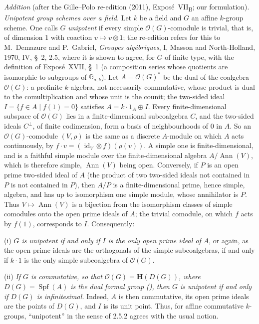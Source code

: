
\par\medskip\noindent
{}
\label{sga3:VIIB:add:unipotent}%
\emph{Addition} (after the Gille--Polo re-edition (2011),
Expos\'e~VII\textsubscript{B}; our formulation). \emph{Unipotent group
schemes over a field.} Let \(k\) be a field and \(G\) an affine \(k\)-group
scheme. One calls \(G\) \emph{unipotent} if every simple
\(\mathcal O(G)\)-comodule is trivial, that is, of dimension \(1\) with
coaction \(v\mapsto v\otimes1\); the re-edition refers for this to
M.~Demazure and P.~Gabriel, \emph{Groupes alg\'ebriques}, I, Masson and
North-Holland, 1970, IV, \S~2, 2.5, where it is shown to agree, for \(G\)
of finite type, with the definition of Expos\'e~XVII, \S~1 (a composition
series whose quotients are isomorphic to subgroups of \(\mathbb G_{a,k}\)).
Let \(A=\mathcal O(G)^*\) be the dual of the coalgebra \(\mathcal O(G)\): a
profinite \(k\)-algebra, not necessarily commutative, whose product is dual
to the comultiplication and whose unit is the counit; the two-sided ideal
\(I=\{f\in A\mid f(1)=0\}\) satisfies \(A=k\cdot1_A\oplus I\). Every
finite-dimensional subspace of \(\mathcal O(G)\) lies in a
finite-dimensional subcoalgebra \(C\), and the two-sided ideals
\(C^\perp\), of finite codimension, form a basis of neighbourhoods of \(0\)
in \(A\). So an \(\mathcal O(G)\)-comodule \((V,\rho)\) is the same as a
discrete \(A\)-module on which \(A\) acts continuously, by
\(f\cdot v=(\operatorname{id}_V\otimes f)(\rho(v))\). A simple one is
finite-dimensional, and is a faithful simple module over the
finite-dimensional algebra \(A/\operatorname{Ann}(V)\), which is therefore
simple, \(\operatorname{Ann}(V)\) being open. Conversely, if \(P\) is an
open prime two-sided ideal of \(A\) (the product of two two-sided ideals
not contained in \(P\) is not contained in \(P\)), then \(A/P\) is a
finite-dimensional prime, hence simple, algebra, and has up to isomorphism
one simple module, whose annihilator is \(P\). Thus
\(V\mapsto\operatorname{Ann}(V)\) is a bijection from the isomorphism classes
of simple comodules onto the open prime ideals of \(A\); the trivial
comodule, on which \(f\) acts by \(f(1)\), corresponds to \(I\).
Consequently:

(i) \emph{\(G\) is unipotent if and only if \(I\) is the only open prime
ideal of \(A\)}, or again, as the open prime ideals are the orthogonals of
the simple subcoalgebras, if and only if \(k\cdot1\) is the only simple
subcoalgebra of \(\mathcal O(G)\).

(ii) \emph{If \(G\) is commutative, so that \(\mathcal O(G)=\mathbf H(D(G))\),
where \(D(G)=\operatorname{Spf}(A)\) is the dual formal group
\textup{()}, then \(G\) is unipotent if and only if \(D(G)\) is
infinitesimal.} Indeed, \(A\) is then commutative, its open prime ideals are
the points of \(D(G)\), and \(I\) is its unit point. Thus, for affine
commutative \(k\)-groups, ``unipotent'' in the sense of 2.5.2 agrees with
the usual notion.
